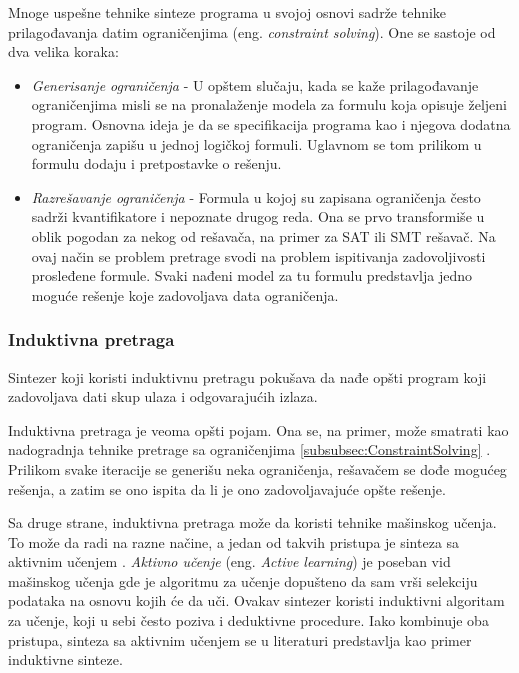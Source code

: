 Mnoge uspešne tehnike sinteze programa u svojoj osnovi sadrže tehnike prilagođavanja datim ograničenjima (eng. \emph{constraint solving}). One se sastoje od dva velika koraka:
\begin{itemize}
    \item \emph{Generisanje ograničenja} - U opštem slučaju, kada se kaže pri\-la\-go\-đa\-va\-nje ograničenjima misli se na pronalaženje modela za formulu koja opisuje željeni program. Osnovna ideja je da se specifikacija programa kao i njegova dodatna ograničenja zapišu u jednoj logičkoj formuli. Uglavnom se tom prilikom u formulu dodaju i pretpostavke o rešenju.
    \item \emph{Razrešavanje ograničenja} - Formula u kojoj su zapisana ograničenja često sadrži kvantifikatore i nepoznate drugog reda. Ona se prvo transformiše u oblik pogodan za nekog od rešavača, na primer za SAT ili SMT rešavač. Na ovaj način se problem pretrage svodi na problem ispitivanja zadovoljivosti prosleđene formule. Svaki nađeni model za tu formulu predstavlja jedno moguće rešenje koje zadovoljava data ograničenja.
\end{itemize}


\subsubsection{Induktivna pretraga}
\label{subsubsec:Induktivna}

Sintezer koji koristi induktivnu pretragu pokušava da nađe opšti program koji zadovoljava dati skup ulaza i odgovarajućih izlaza.

Induktivna pretraga je veoma opšti pojam. Ona se, na primer, može smatrati kao nadogradnja tehnike pretrage sa ograničenjima \ref{subsubsec:ConstraintSolving} \cite{SGS}. Prilikom svake iteracije se generišu neka ograničenja, rešavačem se dođe mogućeg rešenja, a zatim se ono ispita da li je ono zadovoljavajuće opšte rešenje.

Sa druge strane, induktivna pretraga može da koristi tehnike mašinskog učenja. To može da radi na razne načine, a jedan od takvih pristupa je sinteza sa aktivnim učenjem \cite{SGS}. \emph{Aktivno učenje} (eng. \emph{Active learning}) je poseban vid mašinskog učenja gde je algoritmu za učenje dopušteno da sam vrši selekciju podataka na osnovu kojih će da uči. Ovakav sintezer koristi induktivni algoritam za učenje, koji u sebi često poziva i deduktivne procedure. Iako kombinuje oba pristupa, sinteza sa aktivnim učenjem se u literaturi predstavlja kao primer induktivne sinteze.

